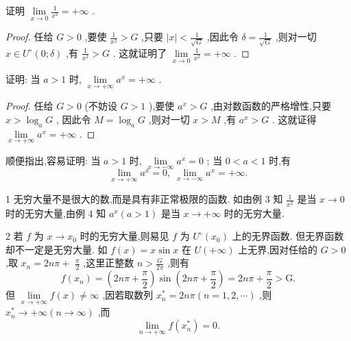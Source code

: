 \begin{example}
证明 \(\mathop{\lim }\limits_{{x \rightarrow  0}}\frac{1}{{x}^{2}} =  + \infty\) .
\end{example}


\begin{proof}
任给 \(G > 0\) ,要使 \(\frac{1}{{x}^{2}} > G\) ,只要 \(\left| x\right|  < \frac{1}{\sqrt{G}}\) ,因此令 \(\delta  = \frac{1}{\sqrt{G}}\) ,则对一切 \(x \in  {U}^{ \circ  }\left( {0;\delta }\right)\) ,有 \(\frac{1}{{x}^{2}} > G\) . 这就证明了 \(\mathop{\lim }\limits_{{x \rightarrow  0}}\frac{1}{{x}^{2}} =  + \infty\) .
\end{proof}


\begin{example}
证明: 当 \(a > 1\) 时, \(\mathop{\lim }\limits_{{x \rightarrow   + \infty }}{a}^{x} =  + \infty\) .
\end{example}


\begin{proof}
任给 \(G > 0\) (不妨设 \(G > 1\) ),要使 \({a}^{x} > G\) ,由对数函数的严格增性,只要 \(x > {\log }_{a}G\) , 因此令 \(M = {\log }_{a}G\) ,则对一切 \(x > M\) ,有 \({a}^{x} > G\) . 这就证得 \(\mathop{\lim }\limits_{{x \rightarrow   + \infty }}{a}^{x} =  + \infty\) .
\end{proof}


顺便指出,容易证明: 当 \(a > 1\) 时, \(\mathop{\lim }\limits_{{x \rightarrow   - \infty }}{a}^{x} = 0\) ; 当 \(0 < a < 1\) 时,有
\[
\mathop{\lim }\limits_{{x \rightarrow   + \infty }}{a}^{x} = 0,\;\mathop{\lim }\limits_{{x \rightarrow   - \infty }}{a}^{x} =  + \infty .
\]
\begin{remark}
1 无穷大量不是很大的数,而是具有非正常极限的函数. 如由例 3 知 \(\frac{1}{{x}^{2}}\) 是当 \(x \rightarrow  0\) 时的无穷大量,由例 4 知 \({a}^{x}\left( {a > 1}\right)\) 是当 \(x \rightarrow   + \infty\) 时的无穷大量.
\end{remark}


\begin{remark}
2 若 \(f\) 为 \(x \rightarrow  {x}_{0}\) 时的无穷大量,则易见 \(f\) 为 \({U}^{ \circ  }\left( {x}_{0}\right)\) 上的无界函数. 但无界函数却不一定是无穷大量. 如 \(f\left( x\right)  = x\sin x\) 在 \(U\left( {+\infty }\right)\) 上无界,因对任给的 \(G > 0\) ,取 \({x}_{n} = {2n\pi } +\)  \(\frac{\pi }{2}\) ,这里正整数 \(n > \frac{G}{2\pi }\) ,则有
\[
f\left( {x}_{n}\right)  = \left( {{2n\pi } + \frac{\pi }{2}}\right) \sin \left( {{2n\pi } + \frac{\pi }{2}}\right)  = {2n\pi } + \frac{\pi }{2} > \mathrm{G}.
\]
但 \(\mathop{\lim }\limits_{{x \rightarrow   + \infty }}f\left( x\right)  \neq  \infty\) ,因若取数列 \({x}_{n}^{ * } = {2n\pi }\left( {n = 1,2,\cdots }\right)\) ,则 \({x}_{n}^{ * } \rightarrow   + \infty \left( {n \rightarrow  \infty }\right)\) ,而
\[
\mathop{\lim }\limits_{{n \rightarrow   + \infty }}f\left( {x}_{n}^{ * }\right)  = 0.
\]
\end{remark}

